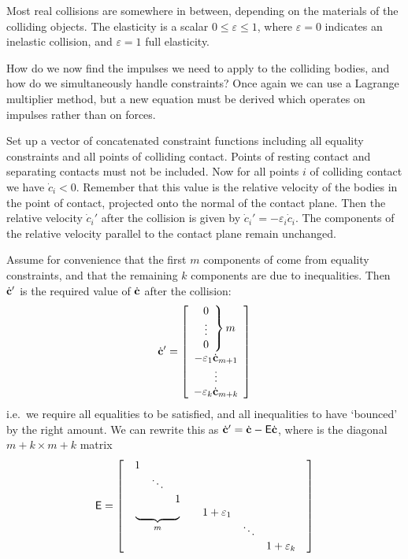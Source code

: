 Most real collisions are somewhere in between, depending on the materials of the colliding
objects. The elasticity is a scalar $0 \le \varepsilon \le 1$, where $\varepsilon = 0$ indicates
an inelastic collision, and $\varepsilon = 1$ full elasticity.

How do we now find the impulses we need to apply to the colliding bodies, and how do we
simultaneously handle constraints? Once again we can use a Lagrange multiplier method, but a new
equation must be derived which operates on impulses rather than on forces.

Set up a vector  of concatenated constraint functions including all equality constraints
and all points of colliding contact. Points of resting contact and separating contacts must
not be included. Now for all points $i$ of colliding contact we have $\dot{c}_i < 0$.
Remember that this value is the relative velocity of the bodies in the point of contact,
projected onto the normal of the contact plane. Then the relative velocity $\dot{c}_i'$ after
the collision is given by $\dot{c}_i' = -\varepsilon_i \dot{c}_i$. The components of the relative
velocity parallel to the contact plane remain unchanged.

Assume for convenience that the first $m$ components of  come from equality constraints, and
that the remaining $k$ components are due to inequalities.
Then $\dot{\ve{c}}'$ is the required value of $\dot{\ve{c}}$ after the collision:
\begin{equation}
\dot{\ve{c}}' = \left[\begin{array}[m]{c}
    \left. \begin{array}{c} 0 \\\vdots\\ 0 \end{array} \right\} m \\
    -\varepsilon_1 \dot{\ve{c}}_{m+1} \\\vdots\\
    -\varepsilon_k \dot{\ve{c}}_{m+k}
    \end{array}\right]
\end{equation}
i.e.\ we require all equalities to be satisfied, and all inequalities to have `bounced' by the
right amount. We can rewrite this as $\dot{\ve{c}}' = \dot{\ve{c}} - \m{E}\dot{\ve{c}}$, where
 is the diagonal $m+k \times m+k$ matrix
\begin{equation}
\mathsf{E} = \left[ \begin{array}{cc}
    \begin{array}{ccc} 1 \\ & \ddots \\ && 1 \end{array} \\
    \underbrace{\quad\quad\quad\quad}_m &
    \begin{array}[t]{ccc} 1+\varepsilon_1 \\ & \ddots \\ && 1+\varepsilon_k \end{array}
    \end{array} \right]
\end{equation}

